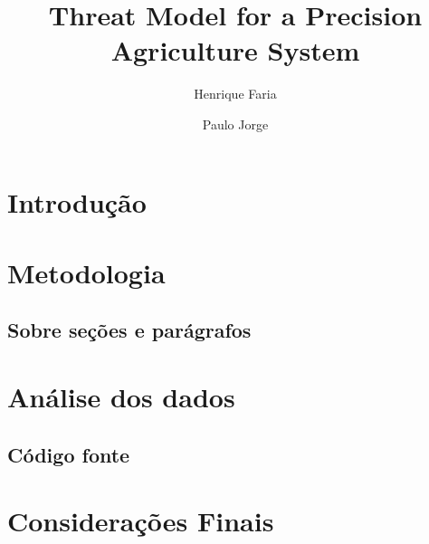 \documentclass[runningheads]{llncs}
\title{Threat Model for a Precision Agriculture System}
\author{Henrique Faria \and Paulo Jorge}
\begin{document}
 

\maketitle

\newpage
\hfill


\begin{resumo}
  
\end{resumo}

\begin{abstract} 


\end{abstract}

\section{Introdução}


\section{Metodologia}

\subsection{Sobre seções e parágrafos}

\section{Análise dos dados}\label{sec:analisedosdados}

 




\subsection{Código fonte}





\section{Considerações Finais}




\end{document}
